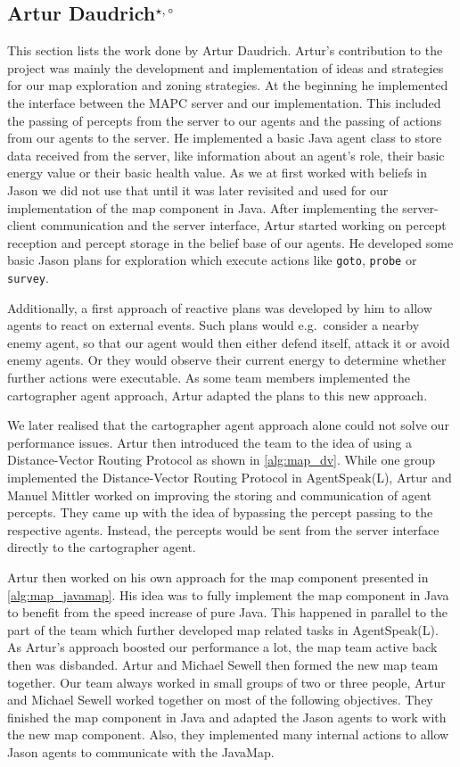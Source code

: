 \subsection[Artur Daudrich]{Artur Daudrich$^{\star,\circ}$}\label{org:artur}
This section lists the work done by Artur Daudrich.
Artur's contribution to the project was mainly the development and implementation of ideas and strategies for our map exploration and zoning strategies.
At the beginning he implemented the interface between the MAPC server and our implementation.
This included the passing of percepts from the server to our agents and the passing of actions from our agents to the server.
He implemented a basic Java agent class to store data received from the server, like information about an agent's role, their basic energy value or their basic health value.
As we at first worked with beliefs in Jason we did not use that until it was later revisited and used for our implementation of the map component in Java.
After implementing the server-client communication and the server interface, Artur started working on percept reception and percept storage in the belief base of our agents.
He developed some basic Jason plans for exploration which execute actions like \texttt{goto}, \texttt{probe} or \texttt{survey}.

Additionally, a first approach of reactive plans was developed by him to allow agents to react on external events.
Such plans would e.g.\ consider a nearby enemy agent, so that our agent would then either defend itself, attack it or avoid enemy agents.
Or they would observe their current energy to determine whether further actions were executable.
As some team members implemented the cartographer agent approach, Artur adapted the plans to this new approach.

We later realised that the cartographer agent approach alone could not solve our performance issues.
Artur then introduced the team to the idea of using a Distance-Vector Routing Protocol as shown in \autoref{alg:map_dv}.
While one group implemented the Distance-Vector Routing Protocol in AgentSpeak(L), Artur and Manuel Mittler worked on improving the storing and communication of agent percepts.
They came up with the idea of bypassing the percept passing to the respective agents.
Instead, the percepts would be sent from the server interface directly to the cartographer agent.

Artur then worked on his own approach for the map component presented in \autoref{alg:map_javamap}.
His idea was to fully implement the map component in Java to benefit from the speed increase of pure Java.
This happened in parallel to the part of the team which further developed map related tasks in AgentSpeak(L).
As Artur's approach boosted our performance a lot, the map team active back then was disbanded.
Artur and Michael Sewell then formed the new map team together.
Our team always worked in small groups of two or three people, Artur and Michael Sewell worked together on most of the following objectives.
They finished the map component in Java and adapted the Jason agents to work with the new map component.
Also, they implemented many internal actions to allow Jason agents to communicate with the JavaMap.

